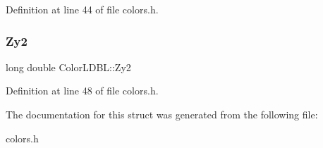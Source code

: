 Definition at line 44 of file colors.\+h.

\mbox{\label{struct_color_l_d_b_l_a6c3bbba3508128ad4c78842cfbe36789}} 
\subsubsection{\texorpdfstring{Zy2}{Zy2}}
{\footnotesize\ttfamily long double Color\+L\+D\+B\+L\+::\+Zy2}



Definition at line 48 of file colors.\+h.



The documentation for this struct was generated from the following file\+:\begin{DoxyCompactItemize}
\item 
colors.\+h\end{DoxyCompactItemize}
